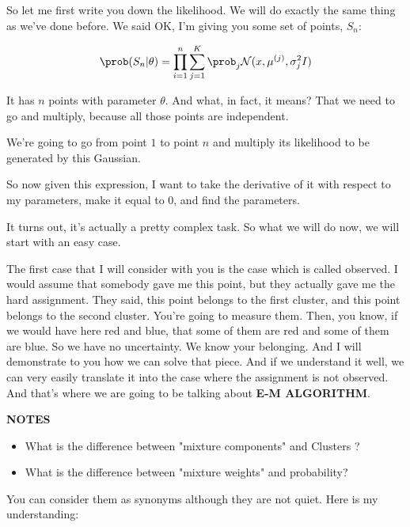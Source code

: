 \documentclass[a4paper, 12pt]{article}
\begin{document}
So let me first write you down the likelihood. We will do exactly the same thing
as we've done before. We said OK, I'm giving you some set of points, \(S_n\):

\begin{equation}
\label{eq:orgd16629e}
\prob(S_n|\theta) = \prod_{i=1}^{n} \sum_{j=1}^{K} \prob_j \mathcal{N}(x, \mu^{(j)}, \sigma_{j}^{2} I) 
\end{equation}

It has \(n\) points with parameter \(\theta\). And what, in fact, it means? That
we need to go and multiply, because all those points are independent.

We're going to go from point \(1\) to point \(n\) and multiply its likelihood to
be generated by this Gaussian.

So now given this expression, I want to take the derivative of it with respect
to my parameters, make it equal to 0, and find the parameters.

It turns out, it's actually a pretty complex task. So what we will do now, we
will start with an easy case.

The first case that I will consider with you is the case which is called
observed. I would assume that somebody gave me this point, but they actually
gave me the hard assignment. They said, this point belongs to the first cluster,
and this point belongs to the second cluster. You're going to measure them.
Then, you know, if we would have here red and blue, that some of them are red
and some of them are blue. So we have no uncertainty. We know your belonging.
And I will demonstrate to you how we can solve that piece. And if we understand
it well, we can very easily translate it into the case where the assignment is
not observed. And that's where we are going to be talking about \textbf{E-M ALGORITHM}.

\textbf{NOTES}

\begin{itemize}
\item What is the difference between "mixture components" and Clusters ?
\item What is the difference between "mixture weights" and probability?
\end{itemize}

You can consider them as synonyms although they are not quiet. Here is my
understanding:
\end{document}
